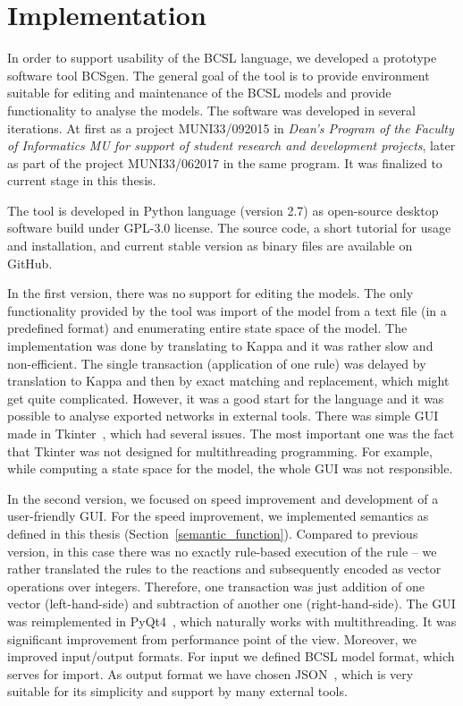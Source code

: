 \documentclass[12pt]{fithesis2}
\begin{document}
\chapter{Implementation}
\label{implementation}

In order to support usability of the BCSL language, we developed a prototype software tool BCSgen. The general goal of the tool is to provide environment suitable for editing and maintenance of the BCSL models and provide functionality to analyse the models. The software was developed in several iterations. At first as a project MUNI33/092015 in \emph{Dean's Program of the Faculty of Informatics MU for support of student research and development projects}, later as part of the project MUNI33/062017 in the same program. It was finalized to current stage in this thesis.

The tool is developed in Python language (version 2.7) as open-source desktop software build under GPL-3.0 license. The source code, a short tutorial for usage and installation, and current stable version as binary files are available on GitHub\footnotemark[1].

In the first version, there was no support for editing the models. The only functionality provided by the tool was import of the model from a text file (in a predefined format) and enumerating entire state space of the model. The implementation was done by translating to Kappa and it was rather slow and non-efficient. The single transaction (application of one rule) was delayed by translation to Kappa and then by exact matching and replacement, which might get quite complicated. However, it was a good start for the language and it was possible to analyse exported networks in external tools. There was simple GUI made in Tkinter~\cite{Tkinter}, which had several issues. The most important one was the fact that Tkinter was not designed for multithreading programming. For example, while computing a state space for the model, the whole GUI was not responsible.

In the second version, we focused on speed improvement and development of a user-friendly GUI. For the speed improvement, we implemented semantics as defined in this thesis (Section~\ref{semantic_function}). Compared to previous version, in this case there was no exactly rule-based execution of the rule -- we rather translated the rules to the reactions and subsequently encoded as vector operations over integers. Therefore, one transaction was just addition of one vector (left-hand-side) and subtraction of another one (right-hand-side). The GUI was reimplemented in PyQt4~\cite{summerfield2007rapid}, which naturally works with multithreading. It was significant improvement from performance point of the view. Moreover, we improved input/output formats. For input we defined BCSL model format, which serves for import. As output format we have chosen JSON~\cite{json}, which is very suitable for its simplicity and support by many external tools.
\end{document}
